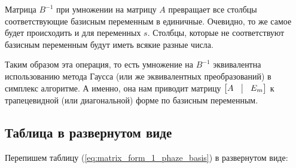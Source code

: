 \documentclass[a4paper,article,14pt]{extarticle}
\begin{document}
Матрица \(B^{-1}\) при умножении на матрицу \(A\) превращает все столбцы соответствующие базисным переменным в единичные.
Очевидно, то же самое будет происходить и для переменных \(s\).
Столбцы, которые не соответствуют базисным переменным будут иметь всякие разные числа.

Таким образом эта операция, то есть умножение на \(B^{-1}\) эквивалентна использованию метода Гаусса (или же эквивалентных преобразований) в симплекс алгоритме.
А именно, она нам приводит матрицу \(
    \begin{bmatrix}
        A & \vline & E_m
    \end{bmatrix}
\) к трапецевидной (или диагональной) форме по базисным переменным.

\subsection{Таблица в развернутом виде}

Перепишем таблицу (\ref{eq:matrix_form_1_phaze_basis}) в развернутом виде:
\end{document}
